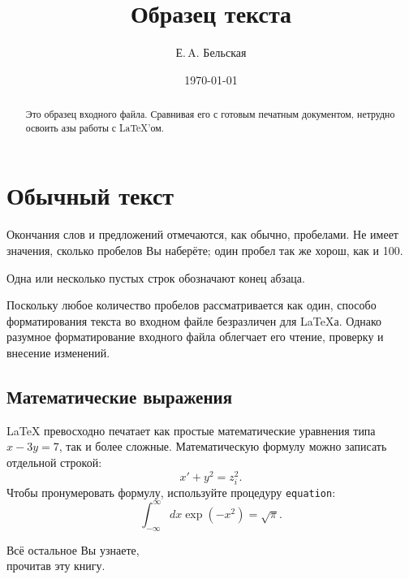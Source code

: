 \documentclass{article}
\title{Образец текста}
\author{Е.\,A. Бельская}
\date{\today}
\begin{document}
\maketitle

\begin{abstract}
Это образец входного файла. Сравнивая его с готовым печатным документом, нетрудно освоить азы работы с \LaTeX'ом.
\end{abstract}

\section{Обычный текст}
Окончания слов и предложений отмечаются, как обычно, пробелами. Не имеет значения, сколько пробелов Вы наберёте; один пробел так же хорош, как и 100.

 
Одна или несколько пустых строк обозначают конец абзаца.

Поскольку любое количество пробелов рассматривается как один, способо форматирования текста во входном файле безразличен для \LaTeX а.
Однако разумное форматирование входного файла облегчает его чтение, проверку и внесение изменений.

\subsection{Математические выражения}
\LaTeX{} превосходно печатает как простые математические уравнения типа 
\(x-3y=7\), так и более сложные.
Математическую формулу можно записать отдельной строкой:
\[x'+y^{2}=z_{i}^{2}.\]
Чтобы пронумеровать формулу, используйте процедуру \texttt{equation}:
\begin{equation}
\int_{-\infty}^{\infty}dx \exp(-x^2)=\sqrt{\pi}.
\end{equation}
\begin{center}
\Large
Всё остальное Вы узнаете,\\ прочитав эту книгу.
\end{center}
\end{document}

